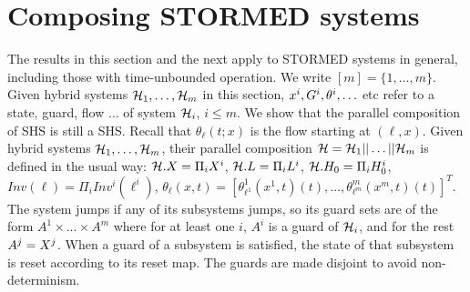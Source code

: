 \section{Composing STORMED systems}
\label{sec:compositionality}
The results in this section and the next apply to STORMED systems in general, including those with time-unbounded operation.
We write $[m] = \{1,\ldots,m\}$.
Given hybrid systems $\mathcal{H}_1,\ldots,\mathcal{H}_m$ in this section, $x^i, G^i, \theta^i,\ldots$ etc refer to a state, guard, flow $\ldots$ of system $\mathcal{H}_i$, $i\leq m$.
%
We show that the parallel composition of SHS is still a SHS.
Recall that $\theta_{\ell}(t;x)$ is the flow starting at $(\ell,x)$.
Given hybrid systems $\mathcal{H}_1,\ldots,\mathcal{H}_m$, their parallel composition $\mathcal{H} = \mathcal{H}_1 || \ldots ||\mathcal{H}_m$ is defined in the usual way:
$\mathcal{H}.X = \Pi_i X^i$,
$\mathcal{H}.L = \Pi_i L^i$,
$\mathcal{H}.H_0 =\Pi_i H_0^i$,
$Inv(\ell) = \Pi_{i}Inv^i(\ell^i)$,
$\theta_{\ell}(x,t)= [\theta_{\ell^1}^1(x^1,t)(t),\ldots,\theta_{\ell^m}^m(x^m,t)(t) ]^T$.
The system jumps if any of its subsystems jumps, so its guard sets are of the form 
$A^1\times\ldots \times A^m$ where for at least one $i$, $A^i$ is a guard of $\mathcal{H}_i$, and for the rest $A^j =X^j$.
When a guard of a subsystem is satisfied, the state of that subsystem is reset according to its reset map.
The guards are made disjoint to avoid non-determinism.

